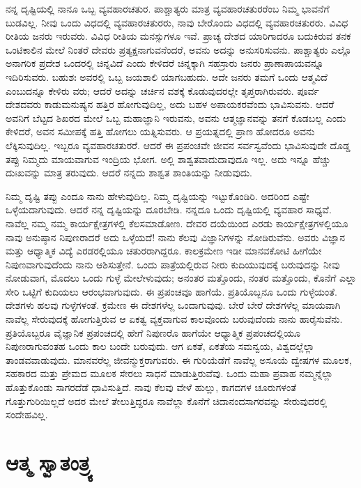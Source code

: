 ನನ್ನ ದೃಷ್ಟಿಯಲ್ಲಿ ನಾನೂ ಒಬ್ಬ ವ್ಯವಹಾರಚತುರ. ಪಾಶ್ಚಾತ್ಯರು ಮಾತ್ರ ವ್ಯವಹಾರಚತುರರೆಂಬ ನಿಮ್ಮ ಭಾವನೆಗೆ ಬುಡವಿಲ್ಲ. ನೀವು ಒಂದು ವಿಧದಲ್ಲಿ ವ್ಯವಹಾರಚತುರರು, ನಾವು ಬೇರೊಂದು ವಿಧದಲ್ಲಿ ವ್ಯವಹಾರಚತುರರು. ವಿವಿಧ ರೀತಿಯ ಜನರು ಇರುವರು. ವಿವಿಧ ರೀತಿಯ ಮನಸ್ಸುಗಳೂ ಇವೆ. ಪ್ರಾಚ್ಯ ದೇಶದ ಯಾರಿಗಾದರೂ ಬದುಕಿರುವ ತನಕ ಒಂಟಿಕಾಲಿನ ಮೇಲೆ ನಿಂತರೆ ದೇವರು ಪ್ರತ್ಯಕ್ಷನಾಗುವನೆಂದರೆ, ಅವನು ಅದನ್ನು ಅನುಸರಿಸುವನು. ಪಾಶ್ಚಾತ್ಯರು ಎಲ್ಲೊ ಅನಾಗರಿಕ ಪ್ರದೇಶ ಒಂದರಲ್ಲಿ ಚಿನ್ನವಿದೆ ಎಂದು ಕೇಳಿದರೆ ಚಿನ್ನಕ್ಕಾಗಿ ಸಹಸ್ರಾರು ಜನರು ಪ್ರಾಣಾಪಾಯವನ್ನೂ ಇದಿರಿಸುವರು. ಬಹುಶಃ ಅವರಲ್ಲಿ ಒಬ್ಬ ಜಯಶಾಲಿ ಯಾಗಬಹುದು. ಅದೇ ಜನರು ತಮಗೆ ಒಂದು ಆತ್ಮವಿದೆ ಎಂಬುದನ್ನೂ ಕೇಳಿರು ವರು; ಆದರೆ ಅದನ್ನು ಚರ್ಚಿನ ವಶಕ್ಕೆ ಕೊಡುವುದರಲ್ಲೇ ತೃಪ್ತರಾಗಿರುವರು. ಪೂರ್ವ ದೇಶದವರು ಕಾಡುಮನುಷ್ಯನ ಹತ್ತಿರ ಹೋಗುವುದಿಲ್ಲ, ಅದು ಬಹಳ ಅಪಾಯಕರವೆಂದು ಭಾವಿಸುವನು. ಆದರೆ ಅವನಿಗೆ ಬೆಟ್ಟದ ಶಿಖರದ ಮೇಲೆ ಒಬ್ಬ ಮಹಾಜ್ಞಾನಿ ಇರುವನು, ಅವನು ಆತ್ಮಜ್ಞಾನವನ್ನು ತನಗೆ ಕೊಡಬಲ್ಲ ಎಂದು ಕೇಳಿದರೆ, ಅವನ ಸಮೀಪಕ್ಕೆ ಹತ್ತಿ ಹೋಗಲು ಯತ್ನಿಸುವರು. ಆ ಪ್ರಯತ್ನದಲ್ಲಿ ಪ್ರಾಣ ಹೋದರೂ ಅವನು ಲೆಕ್ಕಿಸುವುದಿಲ್ಲ. ಇಬ್ಬರೂ ವ್ಯವಹಾರಚತುರರೆ. ಆದರೆ ಈ ಪ್ರಪಂಚವೇ ಜೀವನ ಸರ್ವಸ್ವವೆಂದು ಭಾವಿಸುವುದೇ ದೊಡ್ಡ ತಪ್ಪು ನಿಮ್ಮದು ಮಾಯವಾಗುವ ಇಂದ್ರಿಯ ಭೋಗ. ಅಲ್ಲಿ ಶಾಶ್ವತವಾದುದಾವುದೂ ಇಲ್ಲ. ಅದು ಇನ್ನೂ ಹೆಚ್ಚು ದುಃಖವನ್ನು ಮಾತ್ರ ತರುವುದು. ಆದರೆ ನನ್ನದು ಶಾಶ್ವತ ಶಾಂತಿಯನ್ನು ನೀಡುವುದು.

ನಿಮ್ಮ ದೃಷ್ಟಿ ತಪ್ಪು ಎಂದೂ ನಾನು ಹೇಳುವುದಿಲ್ಲ. ನಿಮ್ಮ ದೃಷ್ಟಿಯನ್ನು ಇಟ್ಟುಕೊಂಡಿರಿ. ಅದರಿಂದ ಎಷ್ಟೇ ಒಳ್ಳೆಯದಾಗುವುದು. ಆದರೆ ನನ್ನ ದೃಷ್ಟಿಯನ್ನು ದೂರಬೇಡಿ. ನನ್ನದೂ ಒಂದು ದೃಷ್ಟಿಯಲ್ಲಿ ವ್ಯವಹಾರ ಸಾಧ್ಯವೆ. ನಾವೆಲ್ಲ ನಮ್ಮ ನಮ್ಮ ಕಾರ್ಯಕ್ಷೇತ್ರಗಳಲ್ಲಿ ಕೆಲಸಮಾಡೋಣ. ದೇವರ ದಯೆಯಿಂದ ಎರಡು ಕಾರ್ಯಕ್ಷೇತ್ರಗಳಲ್ಲಿಯೂ ನಾವು ಅನುಷ್ಠಾನ ನಿಪುಣರಾದರೆ ಅದು ಒಳ್ಳೆಯದೆ! ನಾನು ಕೆಲವು ವಿಜ್ಞಾನಿಗಳನ್ನು ನೋಡಿರುವೆನು. ಅವರು ವಿಜ್ಞಾನ ಮತ್ತು ಆಧ್ಯಾತ್ಮಿಕ ವಿದ್ಯೆ ಎರಡರಲ್ಲಿಯೂ ಚತುರರಾಗಿದ್ದರೂ. ಕಾಲಕ್ರಮೇಣ ಇಡೀ ಮಾನವಕೋಟಿ ಹೀಗೆಯೇ ನಿಪುಣವಾಗುವುದೆಂದು ನಾನು ಆಶಿಸುತ್ತೇನೆ. ಒಂದು ಪಾತ್ರೆಯಲ್ಲಿರುವ ನೀರು ಕುದಿಯುವುದಕ್ಕೆ ಬರುವುದನ್ನು ನೀವು ನೋಡುವಾಗ, ಮೊದಲು ಒಂದು ಗುಳ್ಳೆ ಮೇಲೇಳುವುದು; ಅನಂತರ ಮತ್ತೊಂದು, ನಂತರ ಮತ್ತೊಂದು, ಕೊನೆಗೆ ಎಲ್ಲಾ ಸೇರಿ ಒಟ್ಟಿಗೆ ಕುದಿಯಲು ಆರಂಭವಾಗುವುದು. ಈ ಪ್ರಪಂಚವೂ ಹಾಗೆಯೆ. ಪ್ರತಿಯೊಬ್ಬನೂ ಒಂದು ಗುಳ್ಳೆಯಂತೆ. ದೇಶಗಳು ಹಲವು ಗುಳ್ಳೆಗಳಂತೆ. ಕ್ರಮೇಣ ಈ ದೇಶಗಳೆಲ್ಲ ಒಂದಾಗುವುವು. ಬೇರೆ ಬೇರೆ ದೇಶಗಳೆಲ್ಲ ಮಾಯವಾಗಿ ನಾವೆಲ್ಲ ಸೇರುವುದಕ್ಕೆ ಹೋಗುತ್ತಿರುವ ಆ ಏಕತ್ವ ವ್ಯಕ್ತವಾಗುವ ಕಾಲವೊಂದು ಬರುವುದೆಂದು ನಾನು ಹಾರೈಸುವೆನು. ಪ್ರತಿಯೊಬ್ಬರೂ ವೈಜ್ಞಾನಿಕ ಪ್ರಪಂಚದಲ್ಲಿ ಹೇಗೆ ನಿಪುಣರೊ ಹಾಗೆಯೇ ಆಧ್ಯಾತ್ಮಿಕ ಪ್ರಪಂಚದಲ್ಲಿಯೂ ನಿಪುಣರಾಗುವಂತಹ ಒಂದು ಕಾಲ ಬಂದೇ ಬರುವುದು. ಆಗ ಏಕತೆ, ಏಕತೆಯ ಸಮನ್ವಯ, ವಿಶ್ವದಲ್ಲೆಲ್ಲಾ ತಾಂಡವವಾಡುವುದು. ಮಾನವರೆಲ್ಲ ಜೀವನ್ಮುಕ್ತರಾಗುವರು. ಈ ಗುರಿಯೆಡೆಗೆ ನಾವೆಲ್ಲ ಅಸೂಯೆ ದ್ವೇಷಗಳ ಮೂಲಕ, ಸಹಕಾರದ ಮತ್ತು ಪ್ರೇಮದ ಮೂಲಕ ಸೇರಲು ಸಾಧನೆ ಮಾಡುತ್ತಿರುವೆವು. ಒಂದು ಮಹಾ ಪ್ರವಾಹ ನಮ್ಮನ್ನೆಲ್ಲಾ ಹೊತ್ತುಕೊಂಡು ಸಾಗರದೆಡೆ ಧಾವಿಸುತ್ತಿದೆ. ನಾವು ಕೆಲವು ವೇಳೆ ಹುಲ್ಲು, ಕಾಗದಗಳ ಚೂರುಗಳಂತೆ ಗೊತ್ತುಗುರಿಯಿಲ್ಲದೆ ಅದರ ಮೇಲೆ ತೇಲುತ್ತಿದ್ದರೂ ನಾವೆಲ್ಲಾ ಕೊನೆಗೆ ಚಿದಾನಂದಸಾಗರವನ್ನು ಸೇರುವುದರಲ್ಲಿ ಸಂದೇಹವಿಲ್ಲ.

\chapter{ಆತ್ಮ ಸ್ವಾತಂತ್ರ್ಯ}

